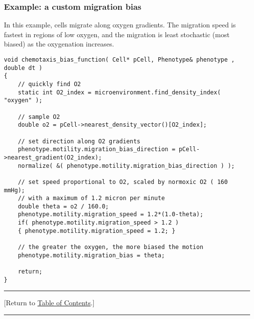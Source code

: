 \documentclass[12pt]{article}
\newcommand{\TOClink}{\begin{center}\hrule\vskip-10pt\phantom{.}\hfill[Return to \hyperlink{TOC}{Table of Contents}.]\hfill\phantom{.}\vskip3pt\hrule\end{center}}
\begin{document}
\subsubsection{Example: a custom migration bias}
\label{sec:Examples:migration}
In this example, cells migrate along oxygen gradients. The 
migration speed is fastest in regions of low oxygen, 
and the migration is least stochastic (most biased) 
as the oxygenation increases. 
\begin{verbatim}
void chemotaxis_bias_function( Cell* pCell, Phenotype& phenotype , double dt )
{
    // quickly find O2 
    static int O2_index = microenvironment.find_density_index( "oxygen" ); 
    
    // sample O2 
    double o2 = pCell->nearest_density_vector()[O2_index]; 
    
    // set direction along O2 gradients 
    phenotype.motility.migration_bias_direction = pCell->nearest_gradient(O2_index); 
    normalize( &( phenotype.motility.migration_bias_direction ) ); 
    
    // set speed proportional to O2, scaled by normoxic O2 ( 160 mmHg); 
    // with a maximum of 1.2 micron per minute 
    double theta = o2 / 160.0;
    phenotype.motility.migration_speed = 1.2*(1.0-theta);   
    if( phenotype.motility.migration_speed > 1.2 )
    { phenotype.motility.migration_speed = 1.2; } 

    // the greater the oxygen, the more biased the motion 
    phenotype.motility.migration_bias = theta; 
    
    return; 
}
\end{verbatim}

\TOClink 
\end{document}

